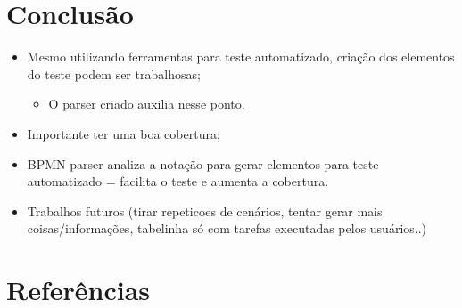 \documentclass[12pt]{article}
\begin{document}
\section{Conclusão}
\begin{itemize}
\item Mesmo utilizando ferramentas para teste automatizado, criação dos elementos do teste podem ser trabalhosas;
\begin{itemize}
\item O parser criado auxilia nesse ponto.
\end{itemize}
\item Importante ter uma boa cobertura;
\item BPMN parser analiza a notação para gerar elementos para teste automatizado = facilita o teste e aumenta a cobertura.
\item Trabalhos futuros (tirar repeticoes de cenários, tentar gerar mais coisas/informações, tabelinha só com tarefas executadas pelos usuários..)
\end{itemize}

\section{Referências}



\end{document}
